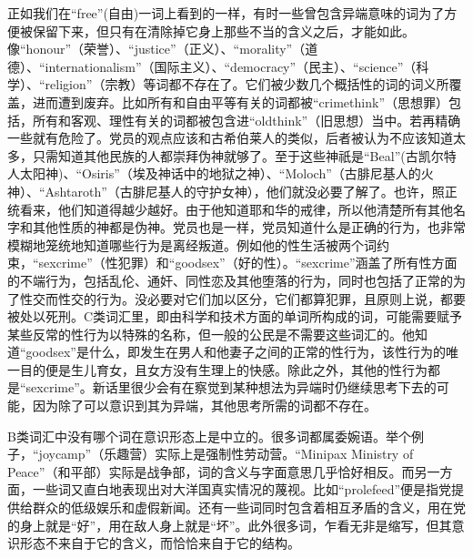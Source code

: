 正如我们在``free''(自由)一词上看到的一样，有时一些曾包含异端意味的词为了方便被保留下来，但只有在清除掉它身上那些不当的含义之后，才能如此。像``honour''（荣誉）、``justice''（正义）、``morality''（道德）、``internationalism''（国际主义）、``democracy''（民主）、``science''（科学）、``religion''（宗教）等词都不存在了。它们被少数几个概括性的词的词义所覆盖，进而遭到废弃。比如所有和自由平等有关的词都被``crimethink''（思想罪）包括，所有和客观、理性有关的词都被包含进``oldthink''（旧思想）当中。若再精确一些就有危险了。党员的观点应该和古希伯莱人的类似，后者被认为不应该知道太多，只需知道其他民族的人都崇拜伪神就够了。至于这些神祇是``Beal''(古凯尔特人太阳神)、``Osiris''（埃及神话中的地狱之神）、``Moloch''（古腓尼基人的火神）、``Ashtaroth''（古腓尼基人的守护女神），他们就没必要了解了。也许，照正统看来，他们知道得越少越好。由于他知道耶和华的戒律，所以他清楚所有其他名字和其他性质的神都是伪神。党员也是一样，党员知道什么是正确的行为，也非常模糊地笼统地知道哪些行为是离经叛道。例如他的性生活被两个词约束，``sexcrime''（性犯罪）和``goodsex''（好的性）。``sexcrime''涵盖了所有性方面的不端行为，包括乱伦、通奸、同性恋及其他堕落的行为，同时也包括了正常的为了性交而性交的行为。没必要对它们加以区分，它们都算犯罪，且原则上说，都要被处以死刑。C类词汇里，即由科学和技术方面的单词所构成的词，可能需要赋予某些反常的性行为以特殊的名称，但一般的公民是不需要这些词汇的。他知道``goodsex''是什么，即发生在男人和他妻子之间的正常的性行为，该性行为的唯一目的便是生儿育女，且女方没有生理上的快感。除此之外，其他的性行为都是``sexcrime''。新话里很少会有在察觉到某种想法为异端时仍继续思考下去的可能，因为除了可以意识到其为异端，其他思考所需的词都不存在。

B类词汇中没有哪个词在意识形态上是中立的。很多词都属委婉语。举个例子，``joycamp''（乐趣营）实际上是强制性劳动营。``Minipax
Ministry of
Peace''（和平部）实际是战争部，词的含义与字面意思几乎恰好相反。而另一方面，一些词又直白地表现出对大洋国真实情况的蔑视。比如``prolefeed''便是指党提供给群众的低级娱乐和虚假新闻。还有一些词同时包含着相互矛盾的含义，用在党的身上就是``好''，用在敌人身上就是``坏''。此外很多词，乍看无非是缩写，但其意识形态不来自于它的含义，而恰恰来自于它的结构。

